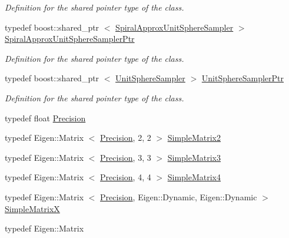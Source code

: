 \begin{DoxyCompactItemize}
\begin{DoxyCompactList}\small\item\em \-Definition for the shared pointer type of the class. \end{DoxyCompactList}\item 
typedef boost\-::shared\-\_\-ptr\*
$<$ \hyperlink{classnext__best__view_1_1SpiralApproxUnitSphereSampler}{\-Spiral\-Approx\-Unit\-Sphere\-Sampler} $>$ \hyperlink{namespacenext__best__view_a76b551eaed77a9e4b0a7e2b73c07458b}{\-Spiral\-Approx\-Unit\-Sphere\-Sampler\-Ptr}
\begin{DoxyCompactList}\small\item\em \-Definition for the shared pointer type of the class. \end{DoxyCompactList}\item 
typedef boost\-::shared\-\_\-ptr\*
$<$ \hyperlink{classnext__best__view_1_1UnitSphereSampler}{\-Unit\-Sphere\-Sampler} $>$ \hyperlink{namespacenext__best__view_ad3328c7d2bb2185c972df039061ad6f5}{\-Unit\-Sphere\-Sampler\-Ptr}
\begin{DoxyCompactList}\small\item\em \-Definition for the shared pointer type of the class. \end{DoxyCompactList}\item 
typedef float \hyperlink{namespacenext__best__view_a471681a7c47e921eda8b6b1ba32b1786}{\-Precision}
\item 
typedef \-Eigen\-::\-Matrix\*
$<$ \hyperlink{namespacenext__best__view_a471681a7c47e921eda8b6b1ba32b1786}{\-Precision}, 2, 2 $>$ \hyperlink{namespacenext__best__view_ac133d93bd53e4270c384bed16adbcdda}{\-Simple\-Matrix2}
\item 
typedef \-Eigen\-::\-Matrix\*
$<$ \hyperlink{namespacenext__best__view_a471681a7c47e921eda8b6b1ba32b1786}{\-Precision}, 3, 3 $>$ \hyperlink{namespacenext__best__view_ac6b088f069768b63919889e90588aa69}{\-Simple\-Matrix3}
\item 
typedef \-Eigen\-::\-Matrix\*
$<$ \hyperlink{namespacenext__best__view_a471681a7c47e921eda8b6b1ba32b1786}{\-Precision}, 4, 4 $>$ \hyperlink{namespacenext__best__view_a77d41215b9a830f85cdf8e2ad175e9c2}{\-Simple\-Matrix4}
\item 
typedef \-Eigen\-::\-Matrix\*
$<$ \hyperlink{namespacenext__best__view_a471681a7c47e921eda8b6b1ba32b1786}{\-Precision}, \-Eigen\-::\-Dynamic, \*
\-Eigen\-::\-Dynamic $>$ \hyperlink{namespacenext__best__view_a547bea8e33e3c78bfa2f6ad90da0c04e}{\-Simple\-Matrix\-X}
\item 
typedef \-Eigen\-::\-Matrix\*

\end{DoxyCompactItemize}
